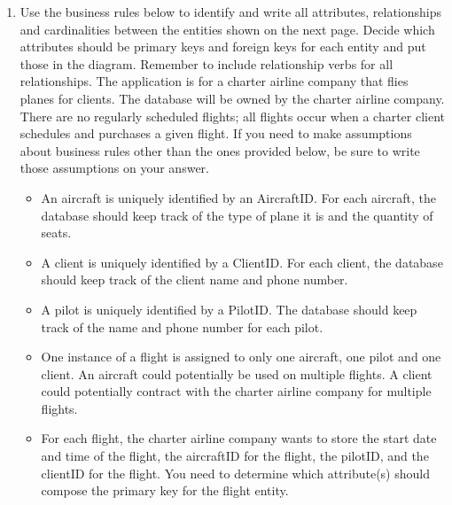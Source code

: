 \documentclass{article}
\begin{document}
\begin{enumerate}
\begin{enumerate}
	\end{enumerate}

	\newpage
	\item Use the business rules below to identify and write all attributes, relationships and cardinalities between the entities shown on the next page. Decide which attributes should be primary keys and foreign keys for each entity and put those in the diagram. Remember to include relationship verbs for all relationships. The application is for a charter airline company that flies planes for clients. The database will be owned by the charter airline company. There are no regularly scheduled flights; all flights occur when a charter client schedules and purchases a given flight. If you need to make assumptions about business rules other than the ones provided below, be sure to write those assumptions on your answer.\\

	\begin{itemize}
		\item An aircraft is uniquely identified by an AircraftID. For each aircraft, the database should keep track of the type of plane it is and the quantity of seats.\\
		\item A client is uniquely identified by a ClientID. For each client, the database should keep track of the client name and phone number.\\
		\item A pilot is uniquely identified by a PilotID. The database should keep track of the name and phone number for each pilot.\\
		\item One instance of a flight is assigned to only one aircraft, one pilot and one client. An aircraft could potentially be used on multiple flights. A client could potentially contract with the charter airline company for multiple flights.\\
		\item For each flight, the charter airline company wants to store the start date and time of the flight, the aircraftID for the flight, the pilotID, and the clientID for the flight. You need to determine which attribute(s) should compose the primary key for the flight entity.\\
	\end{itemize}


\end{enumerate}
\end{document}
